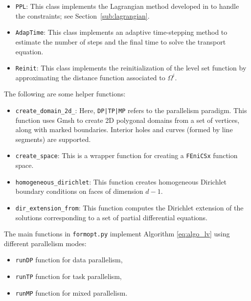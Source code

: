 \documentclass[iicol,pdflatex,sn-mathphys-ay]{sn-jnl}%
\theoremstyle{thmstyleone}%
\theoremstyle{thmstyletwo}%
\theoremstyle{thmstylethree}%
\begin{document}
\begin{itemize}
\item \texttt{PPL}:
This class implements the Lagrangian method developed in \cite{MR4589221}
to handle the constraints; see Section~\ref{sub:lagrangian}.

\item \texttt{AdapTime}:
This class implements an adaptive time-stepping method to
estimate the number of steps and the final time to
solve the transport equation.

\item \texttt{Reinit}:
This class implements the reinitialization of the level set function
by approximating the distance function associated to $\Omega^i$.
\end{itemize}

The following are some helper functions:
\begin{itemize}
\item \texttt{create\_domain\_2d\_<DP|TP|MP>}:
Here, \texttt{DP|TP|MP} refers to the parallelism paradigm.
This function uses Gmsh to create 2D polygonal domains 
from a set of vertices, along with marked boundaries.
Interior holes and curves (formed by line segments) are supported.

\item \texttt{create\_space}:
This is a wrapper function for creating a \texttt{FEniCSx} function space.

\item \texttt{homogeneous\_dirichlet}:
This function creates homogeneous Dirichlet boundary conditions
on faces of dimension $d-1$.

\item \texttt{dir\_extension\_from}:
This function computes the Dirichlet extension of the solutions
corresponding to a set of partial differential equations.
\end{itemize}

The main functions in \texttt{formopt.py}
implement Algorithm \ref{eq:algo_lv} using
different parallelism modes:
\begin{itemize}
\item \texttt{runDP} function for data parallelism,
\item \texttt{runTP} function for task parallelism, 
\item \texttt{runMP} function for mixed parallelism.
\end{itemize}
\end{document}
